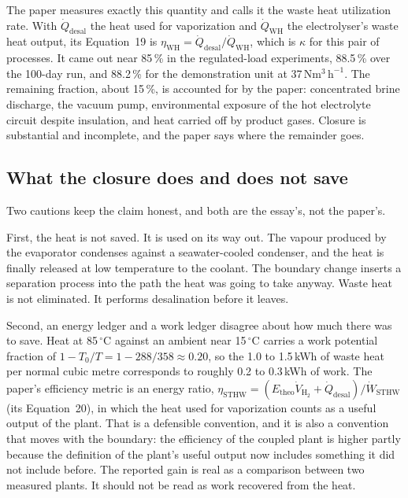 \documentclass[11pt]{article}
\theoremstyle{definition}
\theoremstyle{remark}
\newcommand{\Et}{E_{\mathrm{theo}}}
\begin{document}
The paper measures exactly this quantity and calls it the waste heat utilization rate. With $\dot Q_{\mathrm{desal}}$ the heat used for vaporization and $\dot Q_{\mathrm{WH}}$ the electrolyser's waste heat output, its Equation~19 is $\eta_{\mathrm{WH}}=\dot Q_{\mathrm{desal}}/\dot Q_{\mathrm{WH}}$, which is $\kappa$ for this pair of processes. It came out near 85\,\% in the regulated-load experiments, 88.5\,\% over the 100-day run, and 88.2\,\% for the demonstration unit at 37\,$\mathrm{Nm^{3}\,h^{-1}}$. The remaining fraction, about 15\,\%, is accounted for by the paper: concentrated brine discharge, the vacuum pump, environmental exposure of the hot electrolyte circuit despite insulation, and heat carried off by product gases. Closure is substantial and incomplete, and the paper says where the remainder goes.

\subsection{What the closure does and does not save}

Two cautions keep the claim honest, and both are the essay's, not the paper's.

First, the heat is not saved. It is used on its way out. The vapour produced by the evaporator condenses against a seawater-cooled condenser, and the heat is finally released at low temperature to the coolant. The boundary change inserts a separation process into the path the heat was going to take anyway. Waste heat is not eliminated. It performs desalination before it leaves.

Second, an energy ledger and a work ledger disagree about how much there was to save. Heat at 85\,$^{\circ}$C against an ambient near 15\,$^{\circ}$C carries a work potential fraction of $1-T_0/T = 1-288/358\approx 0.20$, so the 1.0 to 1.5\,kWh of waste heat per normal cubic metre corresponds to roughly 0.2 to 0.3\,kWh of work. The paper's efficiency metric is an energy ratio, $\eta_{\mathrm{STHW}}=(\Et\dot V_{\mathrm{H_2}}+\dot Q_{\mathrm{desal}})/\dot W_{\mathrm{STHW}}$ (its Equation~20), in which the heat used for vaporization counts as a useful output of the plant. That is a defensible convention, and it is also a convention that moves with the boundary: the efficiency of the coupled plant is higher partly because the definition of the plant's useful output now includes something it did not include before. The reported gain is real as a comparison between two measured plants. It should not be read as work recovered from the heat.
\end{document}

